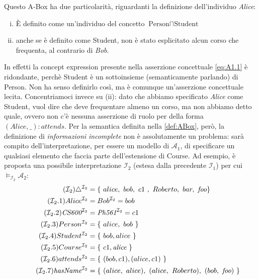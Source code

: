 \noindent
Questo A-Box ha due particolarità, riguardanti la definizione dell'individuo \textit{Alice}:
\begin{enumerate}[(i)]
	\item È definito come un'individuo del concetto $\text{Person} \sqcap \text{Student}$
	\item anche se è definito come Student, non è stato esplicitato alcun corso che frequenta, al contrario di \textit{Bob}.
\end{enumerate}
In effetti la concept expression presente nella asserzione concettuale \eqref{eq:A1.1} è ridondante, perchè Student è un sottoinsieme (semanticamente parlando) di Person. Non ha senso definirlo così, ma è comunque un'asserzione concettuale lecita. Concentriamoci invece su (ii): dato che abbiamo specificato \textit{Alice} come Student, vuol dire che deve frequentare almeno un corso, ma non abbiamo detto quale, ovvero non c'è nessuna asserzione di ruolo per della forma $(\textit{Alice}, \_) : attends$. Per la semantica definita nella \autoref{def:ABox}, però, la definizione di \textit{informazioni incomplete} non è assolutamente un problema: sarà compito dell'interpretazione, per essere un modello di $\mathcal{A}_1$, di specificare un qualsiasi elemento che faccia parte dell'estensione di Course. Ad esempio, è proposta una possibile interpretazione $\mathcal{I}_2$ (estesa dalla precedente $\mathcal{I}_1$) per cui $\models_{\mathcal{I}_2} \mathcal{A}_2$:
\begin{align}
	\tag{$\mathcal{I}_2$} \label{eq:I2}
	\triangle^{\mathcal{I}_2} &= \{\ alice,\ bob,\ c1\ ,\ Roberto,\ bar,\ \textit{foo}\}\\
	\tag{$\mathcal{I}_2$.1} \label{eq:I2.1}
	Alice^{\mathcal{I}_2} &= Bob^{\mathcal{I}_2} = bob\\
	\tag{$\mathcal{I}_2$.2} \label{eq:I2.2}
	\textit{CS600}^{\mathcal{I}_2} &= \textit{Ph561}^{\mathcal{I}_2} = c1\\
	\tag{$\mathcal{I}_2$.3} \label{eq:I2.3}
	Person^{\mathcal{I}_2} &= \{\ alice,\ bob\ \}\\
	\tag{$\mathcal{I}_2$.4} \label{eq:I2.4}
	Student^{\mathcal{I}_2} &= \{\ bob, alice\ \} \\
	\tag{$\mathcal{I}_2$.5} \label{eq:I2.5}
	Course^{\mathcal{I}_2} &= \{\ c1, \textit{alice}\ \}\\
	\tag{$\mathcal{I}_2$.6} \label{eq:I2.6}
	attends^{\mathcal{I}_2} &= \{\ (bob, c1), (alice, c1)\ \}\\
	\tag{$\mathcal{I}_2$.7} \label{eq:I2.7}
	\textit{hasName}^{\mathcal{I}_2} &= \{\ (alice,\ alice),\ (alice,\ Roberto),\ (bob,\ \textit{foo})\ \}
\end{align}
